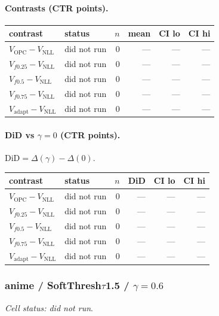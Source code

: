 \documentclass[10pt,a4paper]{article}
\begin{document}
\paragraph{Contrasts (CTR points).}
{\centering\small\begin{tabular}{llrrrr}
\toprule contrast & status & $n$ & mean & CI lo & CI hi \\
\midrule
$V_{\mathrm{OPC}}-V_{\mathrm{NLL}}$ & did not run & 0 & --- & --- & --- \\
$V_{f0.25}-V_{\mathrm{NLL}}$ & did not run & 0 & --- & --- & --- \\
$V_{f0.5}-V_{\mathrm{NLL}}$ & did not run & 0 & --- & --- & --- \\
$V_{f0.75}-V_{\mathrm{NLL}}$ & did not run & 0 & --- & --- & --- \\
$V_{\mathrm{adapt}}-V_{\mathrm{NLL}}$ & did not run & 0 & --- & --- & --- \\
\bottomrule\end{tabular}\par}
\paragraph{DiD vs $\gamma=0$ (CTR points).} $\mathrm{DiD}=\Delta(\gamma)-\Delta(0)$.
{\centering\small\begin{tabular}{llrrrr}
\toprule contrast & status & $n$ & DiD & CI lo & CI hi \\
\midrule
$V_{\mathrm{OPC}}-V_{\mathrm{NLL}}$ & did not run & 0 & --- & --- & --- \\
$V_{f0.25}-V_{\mathrm{NLL}}$ & did not run & 0 & --- & --- & --- \\
$V_{f0.5}-V_{\mathrm{NLL}}$ & did not run & 0 & --- & --- & --- \\
$V_{f0.75}-V_{\mathrm{NLL}}$ & did not run & 0 & --- & --- & --- \\
$V_{\mathrm{adapt}}-V_{\mathrm{NLL}}$ & did not run & 0 & --- & --- & --- \\
\bottomrule\end{tabular}\par}
\bigskip
\subsubsection{anime / SoftThresh$\tau$1.5 / $\gamma=0.6$}
\emph{Cell status: did not run}.
\end{document}

